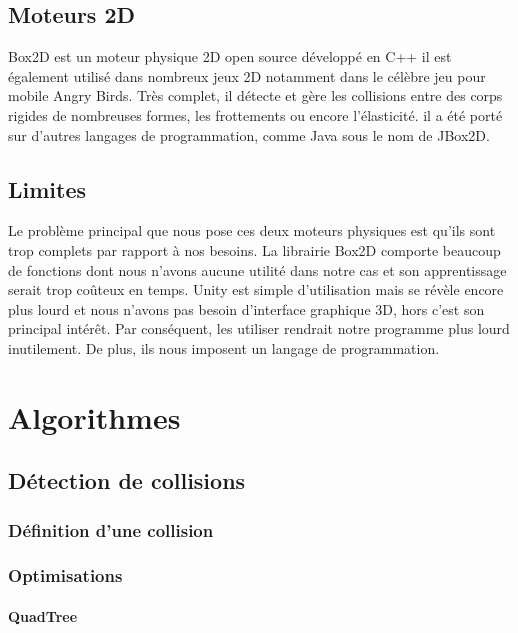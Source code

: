 \documentclass{report}
\begin{document}
\subsection{Moteurs 2D}

Box2D est un moteur physique 2D open source développé en C++ il est également utilisé dans nombreux jeux 2D notamment dans le célèbre jeu pour mobile Angry Birds. Très complet, il détecte et gère les collisions entre des corps rigides de nombreuses formes, les frottements ou encore l’élasticité. il a été porté sur d’autres langages de programmation, comme Java sous le nom de JBox2D.  


\subsection{Limites}

Le problème principal que nous pose ces deux moteurs physiques est qu’ils sont trop complets par rapport à nos besoins. La librairie Box2D comporte beaucoup de fonctions dont nous n’avons aucune utilité dans notre cas et son apprentissage serait trop coûteux en temps. Unity est simple d’utilisation mais se révèle encore plus lourd et nous n’avons pas besoin d’interface graphique 3D, hors c’est son principal intérêt. Par conséquent, les utiliser rendrait notre programme plus lourd inutilement. De plus, ils nous imposent un langage de programmation.

\section{Algorithmes}

\subsection{Détection de collisions}

\subsubsection{Définition d'une collision}

\subsubsection{Optimisations}

\paragraph{QuadTree}
\end{document}
